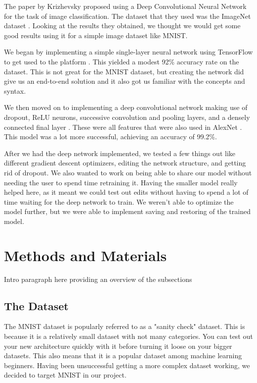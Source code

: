 \documentclass{article}
\begin{document}
The paper by Krizhevsky proposed using a Deep Convolutional Neural Network for the task of image classification. The dataset that they used was the ImageNet dataset \cite{alexnet}. Looking at the results they obtained, we thought we would get some good results using it for a simple image dataset like MNIST. 

We began by implementing a simple single-layer neural network using TensorFlow to get used to the platform \cite{tutorial}. This yielded a modest 92\% accuracy rate on the dataset. This is not great for the MNIST dataset, but creating the network did give us an end-to-end solution and it also got us familiar with the concepts and syntax.  

We then moved on to implementing a deep convolutional network making use of dropout, ReLU neurons, successive convolution and pooling layers, and a densely connected final layer \cite{tutorial-cnn}. These were all features that were also used in AlexNet \cite{alexnet-features}. This model was a lot more successful, achieving an accuracy of 99.2\%. 

After we had the deep network implemented, we tested a few things out like different gradient descent optimizers, editing the network structure, and getting rid of dropout. We also wanted to work on being able to share our model without needing the user to spend time retraining it. Having the smaller model really helped here, as it meant we could test out edits without having to spend a lot of time waiting for the deep network to train. We weren't able to optimize the model further, but we were able to implement saving and restoring of the trained model.

\section{Methods and Materials}

Intro paragraph here providing an overview of the subsections

\subsection{The Dataset}

The MNIST dataset is popularly referred to as a "sanity check" dataset. This is because it is a relatively small dataset with not many categories. You can test out your new architecture quickly with it before turning it loose on your bigger datasets. This also means that it is a popular dataset among machine learning beginners. Having been unsuccessful getting a more complex dataset working, we decided to target MNIST in our project.
\end{document}
